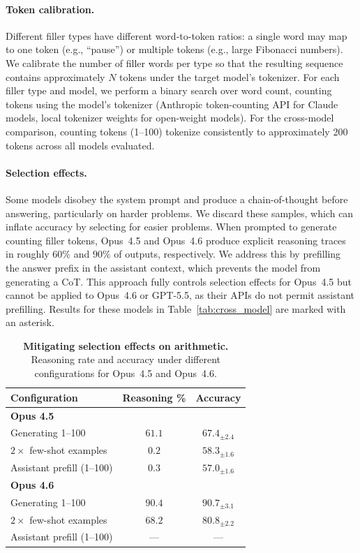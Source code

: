 \documentclass{article}
\begin{document}
\paragraph{Token calibration.} Different filler types have different word-to-token ratios: a single word may map to one token (e.g., ``pause'') or multiple tokens (e.g., large Fibonacci numbers). We calibrate the number of filler words per type so that the resulting sequence contains approximately $N$ tokens under the target model's tokenizer. For each filler type and model, we perform a binary search over word count, counting tokens using the model's tokenizer (Anthropic token-counting API for Claude models, local tokenizer weights for open-weight models). For the cross-model comparison, counting tokens (1--100) tokenize consistently to approximately 200 tokens across all models evaluated.

\paragraph{Selection effects.} Some models disobey the system prompt and produce a chain-of-thought before answering, particularly on harder problems. We discard these samples, which can inflate accuracy by selecting for easier problems. When prompted to generate counting filler tokens, Opus~4.5 and Opus~4.6 produce explicit reasoning traces in roughly $60\%$ and $90\%$ of outputs, respectively. We address this by prefilling the answer prefix in the assistant context, which prevents the model from generating a CoT. This approach fully controls selection effects for Opus~4.5 but cannot be applied to Opus~4.6 or GPT-5.5, as their APIs do not permit assistant prefilling. Results for these models in Table~\ref{tab:cross_model} are marked with an asterisk.

\begin{table}[h]
\centering
\caption{\textbf{Mitigating selection effects on arithmetic.} Reasoning rate and accuracy under different configurations for Opus~4.5 and Opus~4.6.}
\label{tab:selectioneffects}
\small
{}
\begin{tabular}{@{}lcc@{}}
\toprule
\textbf{Configuration} & \textbf{Reasoning \%} & \textbf{Accuracy} \\
\midrule
\multicolumn{3}{l}{\textbf{Opus 4.5}} \\
\midrule
Generating 1--100           & $61.1$ & $67.4_{\pm 2.4}$ \\
$2\times$ few-shot examples & $0.2$  & $58.3_{\pm 1.6}$ \\
Assistant prefill (1--100)  & $0.3$  & $57.0_{\pm 1.6}$ \\
\midrule
\multicolumn{3}{l}{\textbf{Opus 4.6}} \\
\midrule
Generating 1--100           & $90.4$ & $90.7_{\pm 3.1}$ \\
$2\times$ few-shot examples & $68.2$ & $80.8_{\pm 2.2}$ \\
Assistant prefill (1--100)  & ---    & ---              \\
\bottomrule
\end{tabular}
\end{table}
\end{document}
